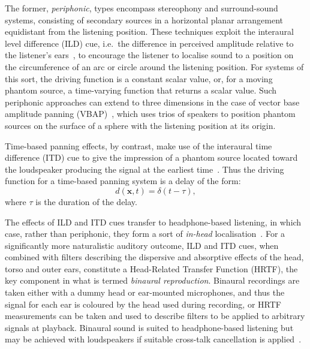 The former, \textit{periphonic}, types encompass stereophony and surround-sound
systems, consisting of secondary sources in a horizontal planar arrangement
equidistant from the listening position.
These techniques exploit the interaural level difference (ILD) cue, i.e.\ the
difference in perceived amplitude relative to the listener's
ears~\citep{pulkki_virtual_1997,verheijen_sound_1998,ziemer_wave_2020}, to
encourage the listener to localise sound to a position on the circumference of
an arc or circle around the listening position.
For systems of this sort, the driving function is a constant scalar value, or,
for a moving phantom source, a time-varying function that returns a scalar
value.
Such periphonic approaches can extend to three dimensions in the case of
vector base amplitude panning (VBAP)~\citep{pulkki_virtual_1997}, which uses
trios of speakers to position phantom sources on the surface of a sphere
with the listening position at its origin.

Time-based panning effects, by contrast, make use of the interaural time
difference (ITD) cue to give the impression of a phantom source located toward
the loudspeaker producing the signal at the earliest
time~\citep{pulkki_virtual_1997,verheijen_sound_1998}.
Thus the driving function for a time-based panning system is a delay of the
form:
\begin{equation}
    d(\mathbf{x},t) = \delta(t - \tau),
    \label{eq:time-driving-function}
\end{equation}
where $\tau$ is the duration of the delay.

The effects of ILD and ITD cues transfer to headphone-based listening, in which
case, rather than periphonic, they form a sort of \textit{in-head}
localisation~\citep{ahrens_analytic_2012}.
For a significantly more naturalistic auditory outcome, ILD and ITD cues, when
combined with filters describing the dispersive and absorptive effects of the
head, torso and outer ears, constitute a Head-Related Transfer Function (HRTF),
the key component in what is termed \textit{binaural reproduction}.
Binaural recordings are taken either with a dummy head or ear-mounted
microphones, and thus the signal for each ear is coloured by the head used
during recording, or HRTF measurements can be taken and used to describe filters
to be applied to arbitrary signals at playback.
Binaural sound is suited to headphone-based listening but may be achieved with
loudspeakers if suitable cross-talk cancellation is
applied~\citep{kaiser_transaural_2011}.

